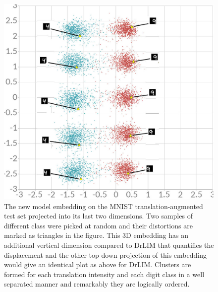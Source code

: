 \documentclass[a4paper,12pt]{report}
\begin{document}
\begin{figure}
    \centering
    \includegraphics[width=\textwidth]{thesis_figures/mnist_cl2d.jpg}
    \caption{The new model embedding on the MNIST translation-augmented test set projected into its last two dimensions.
    Two samples of different class were picked at random and their distortions are marked as triangles in the figure.
    This 3D embedding has an additional vertical dimension compared to DrLIM that quantifies the displacement and the other top-down projection of this embedding would give an identical plot as above for DrLIM.
    Clusters are formed for each translation intensity and each digit class in a well separated manner and remarkably they are logically ordered.
    }
    \label{fig:mnist_cl2d_1}
\end{figure}
\end{document}
